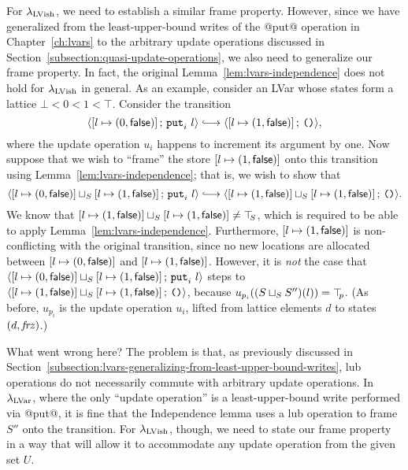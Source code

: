 For $\lambda_{\textrm{LVish}}$, we need to establish a similar frame property.
However, since we have generalized from the least-upper-bound writes
of the @put@ operation in Chapter~\ref{ch:lvars} to the arbitrary
update operations discussed in
Section~\ref{subsection:quasi-update-operations}, we also need to
generalize our frame property.  In fact, the original
Lemma~\ref{lem:lvars-independence} does not hold for $\lambda_{\textrm{LVish}}$ in
general.  As an example, consider an LVar whose states form a lattice
$\bot < 0 < 1 < \top$.  Consider the transition
\[
\config{\store{\storebinding{l}{0}{\frozenfalse}}}{\putiexp{l}}
\parstepsto \config{\store{\storebinding{l}{1}{\frozenfalse}}}{\unit},
\]
where the update operation $u_i$ happens to increment its argument by
one.  Now suppose that we wish to ``frame'' the store
$\left[ l \mapsto (1, \textsf{false}) \right]$ onto this transition using
Lemma~\ref{lem:lvars-independence}; that is, we wish to show that
\[
\config{\lubstore{\store{\storebinding{l}{0}{\frozenfalse}}}{\store{\storebinding{l}{1}{\frozenfalse}}}}{\putiexp{l}}
\parstepsto
\config{\lubstore{\store{\storebinding{l}{1}{\frozenfalse}}}{\store{\storebinding{l}{1}{\frozenfalse}}}}{\unit}.
\]
We know that
$\left[ l \mapsto (1, \textsf{false}) \right] \sqcup_{S} \left[ l \mapsto (1, \textsf{false}) \right]
\neq \top\hspace{-0.85mm}_{S}$, which is required to be able to apply
Lemma~\ref{lem:lvars-independence}.  Furthermore,
$\left[ l \mapsto (1, \textsf{false}) \right]$ is non-conflicting with
the original transition, since no new locations are allocated between
$\left[ l \mapsto (0, \textsf{false}) \right]$ and
$\left[ l \mapsto (1, \textsf{false}) \right]$.  However, it is
\emph{not} the case that
$\langle \left[ l \mapsto (0, \textsf{false}) \right] \sqcup_{S} \left[ l \mapsto (1, \textsf{false}) \right];\, \mbox{\texttt{put}}_i~l \rangle$
steps to
$\langle \left[ l \mapsto (1, \textsf{false}) \right] \sqcup_{S} \left[ l \mapsto (1, \textsf{false}) \right];\, \mbox{\texttt{()}} \rangle$,
because $u_{p_i}((S \sqcup_{S} S'')(l)) = \top\hspace{-0.85mm}_{p}$.  (As before,
$u_{p_i}$ is the update operation $u_i$, lifted from lattice elements
$d$ to states $(d, \mathit{frz})$.)

What went wrong here?  The problem is that, as previously discussed in
Section~\ref{subsection:lvars-generalizing-from-least-upper-bound-writes},
lub operations do not necessarily commute with arbitrary update
operations.  In $\lambda_{\textrm{LVar}}$, where the only ``update operation'' is
a least-upper-bound write performed via @put@, it is fine that the
Independence lemma uses a lub operation to frame $S''$ onto the
transition. For $\lambda_{\textrm{LVish}}$, though, we need to state our frame
property in a way that will allow it to accommodate any update
operation from the given set $U$.

